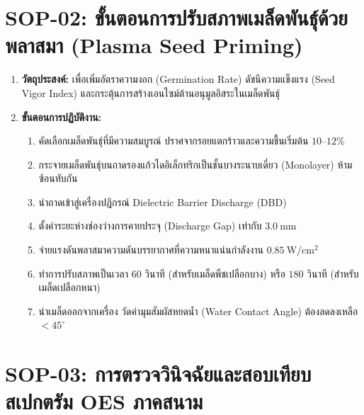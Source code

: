 \section{SOP-02: ขั้นตอนการปรับสภาพเมล็ดพันธุ์ด้วยพลาสมา (Plasma Seed Priming)}
\label{app:sop_seed}


\begin{enumerate}[leftmargin=2.0em, itemsep=6pt]
    \item \textbf{วัตถุประสงค์:} เพื่อเพิ่มอัตราความงอก (Germination Rate) ดัชนีความแข็งแรง (Seed Vigor Index) และกระตุ้นการสร้างเอนไซม์ต้านอนุมูลอิสระในเมล็ดพันธุ์
    \item \textbf{ขั้นตอนการปฏิบัติงาน:}
    \begin{enumerate}[label=\arabic*., leftmargin=1.5em, itemsep=3pt]
        \item คัดเลือกเมล็ดพันธุ์ที่มีความสมบูรณ์ ปราศจากรอยแตกร้าวและความชื้นเริ่มต้น $10$--$12\%$
        \item กระจายเมล็ดพันธุ์บนถาดรองแก้วไดอิเล็กทริกเป็นชั้นบางระนาบเดี่ยว (Monolayer) ห้ามซ้อนทับกัน
        \item นำถาดเข้าสู่เครื่องปฏิกรณ์ Dielectric Barrier Discharge (DBD)
        \item ตั้งค่าระยะห่างช่องว่างการคายประจุ (Discharge Gap) เท่ากับ $3.0\ \si{\milli\meter}$
        \item จ่ายแรงดันพลาสมาความดันบรรยากาศที่ความหนาแน่นกำลังงาน $0.85\ \si{\watt\per\centi\meter\squared}$
        \item ทำการปรับสภาพเป็นเวลา $60\text{ วินาที}$ (สำหรับเมล็ดพืชเปลือกบาง) หรือ $180\text{ วินาที}$ (สำหรับเมล็ดเปลือกหนา)
        \item นำเมล็ดออกจากเครื่อง วัดค่ามุมสัมผัสหยดน้ำ (Water Contact Angle) ต้องลดลงเหลือ $< 45^\circ$
    \end{enumerate}
\end{enumerate}

\section{SOP-03: การตรวจวินิจฉัยและสอบเทียบสเปกตรัม OES ภาคสนาม}
\label{app:sop_oes}


